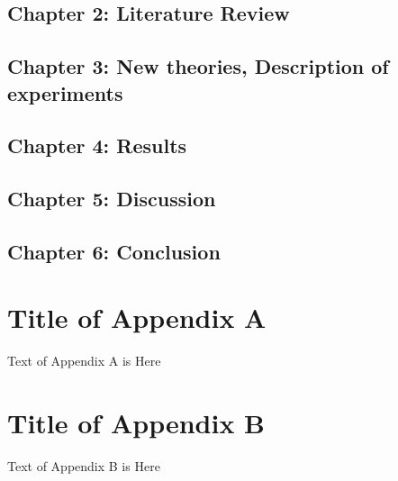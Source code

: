 \documentclass{article}
\begin{document}
	\subsection{Chapter 2: Literature Review}
	\subsection{Chapter 3: New theories, Description of experiments}
	\subsection{Chapter 4: Results}
	\subsection{Chapter 5: Discussion}
	\subsection{Chapter 6: Conclusion}
	
	
	
	

	\appendix
	\section{Title of Appendix A}

	Text of Appendix A is Here

	\section{Title of Appendix B}

	Text of Appendix B is Here
\end{document}
